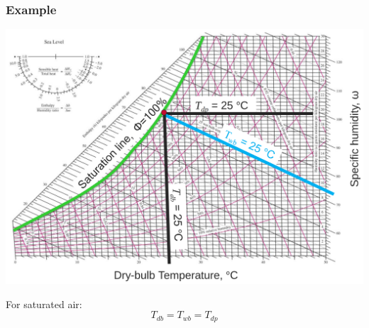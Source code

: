 \documentclass[11pt]{article}
\begin{document}
\subsubsection{Example}
\label{sec:org5320107}
\begin{center}
\includegraphics[width=.9\linewidth]{./images/psychrometric-chart-example.png}
\end{center}

For saturated air:
\[T_{db} = T_{wb} = T_{dp}\]
\end{document}
